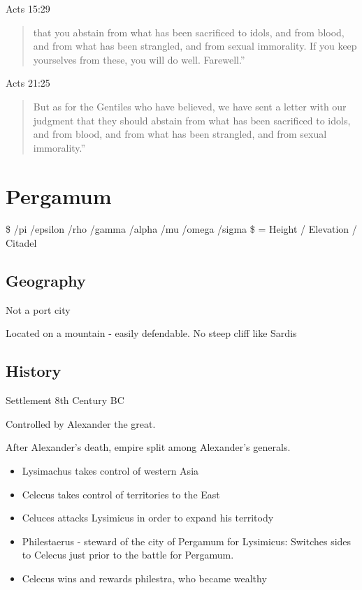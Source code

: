 \documentclass[
]{book}
\providecommand{\tightlist}{%
  \setlength{\itemsep}{0pt}\setlength{\parskip}{0pt}}
\begin{document}
Acts 15:29

\begin{quote}
that you abstain from what has been sacrificed to idols, and from blood, and from what has been strangled, and from sexual immorality. If you keep yourselves from these, you will do well. Farewell.''
\end{quote}

Acts 21:25

\begin{quote}
But as for the Gentiles who have believed, we have sent a letter with our judgment that they should abstain from what has been sacrificed to idols, and from blood, and from what has been strangled, and from sexual immorality.''
\end{quote}

\hypertarget{pergamum}{%
\chapter{Pergamum}\label{pergamum}}

\$ /pi /epsilon /rho /gamma /alpha /mu /omega /sigma \$ = Height / Elevation / Citadel

\hypertarget{geography-1}{%
\section{Geography}\label{geography-1}}

Not a port city

Located on a mountain - easily defendable. No steep cliff like Sardis

\hypertarget{history-4}{%
\section{History}\label{history-4}}

Settlement 8th Century BC

Controlled by Alexander the great.

After Alexander's death, empire split among Alexander's generals.

\begin{itemize}
\tightlist
\item
  Lysimachus takes control of western Asia
\item
  Celecus takes control of territories to the East
\item
  Celuces attacks Lysimicus in order to expand his territody
\item
  Philestaerus - steward of the city of Pergamum for Lysimicus: Switches sides to Celecus just prior to the battle for Pergamum.
\item
  Celecus wins and rewards philestra, who became wealthy
\end{itemize}
\end{document}
